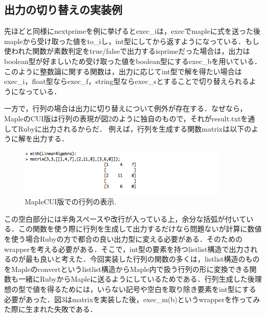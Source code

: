 \subsection{出力の切り替えの実装例}
先ほどと同様にnextprimeを例に挙げるとexec\_iは，execでmapleに式を送った後mapleから受け取った値をto\_iし，int型にしてから返すようになっている．もし使われた関数が素数判定をtrue/falseで出力するisprimeだった場合は，出力はboolean型が好ましいため受け取った値をboolean型にするexec\_bを用いている．このように整数論に関する関数は，出力に応じてint型で解を得たい場合はexec\_i，float型ならexec\_f，string型ならexec\_sとすることで切り替えられるようになっている．

一方で，行列の場合は出力に切り替えについて例外が存在する．なぜなら，MapleのCUI版は行列の表現が図2のように独自のもので，それがresult.txtを通してRubyに出力されるからだ．
例えば，行列を生成する関数matrixは以下のように解を出力する．

\begin{figure}[htbp]\begin{center}
\includegraphics[width=10cm,bb= 0 0 737 553]{../figs/./mapleruby_eringi.exmatrix.png}
\caption{MapleCUI版での行列の表示.}
\label{default}\end{center}\end{figure}
この空白部分には半角スペースや改行が入っている上，余分な括弧が付いている．この関数を使う際に行列を生成して出力するだけなら問題ないが計算に数値を使う場合Rubyの方で都合の良い出力型に変える必要がある．そのためのwrapperを考える必要がある．そこで，int型の要素を持つlistlist構造で出力されるのが最も良いと考えた．今回実装した行列の関数の多くは，listlist構造のものをMapleのconvertというlistlist構造からMaple内で扱う行列の形に変換できる関数も一緒にRubyからMapleに送るようにしているためである．行列生成した後理想の型で値を得るためには，いらない記号や空白を取り除き要素をint型にする必要があった．図3はmatrixを実装した後，exec\_m(b)というwrapperを作ってみた際に生まれた失敗である．

